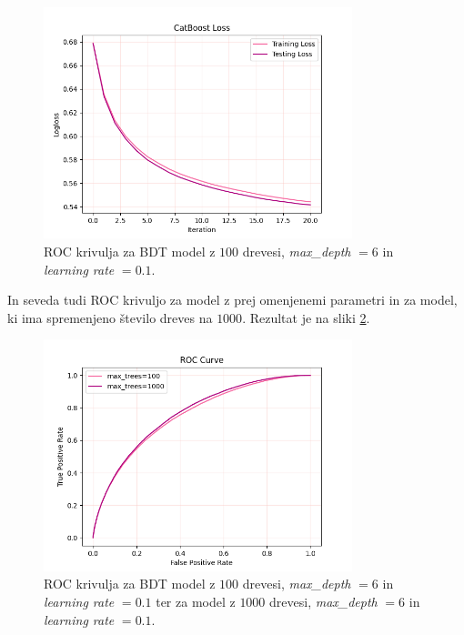 \documentclass[a4paper]{article}
\begin{document}
\begin{figure}[H]
    \centering
    \includegraphics[width=0.8\textwidth]{../images/catboost_loss.png}
    \caption{ROC krivulja za BDT model z $100$ drevesi, \textit{max\_depth} $= 6$ in \textit{learning rate} $= 0.1$.}
    \label{fig:BDT_ROC}
\end{figure}

In seveda tudi ROC krivuljo za model z prej omenjenemi parametri in za model, ki ima spremenjeno število dreves na $1000$. 
Rezultat je na sliki \ref{fig:BDT_ROC}. \\

\begin{figure}[H]
    \centering
    \includegraphics[width=0.8\textwidth]{../images/catboost_roc.png}
    \caption{ROC krivulja za BDT model z $100$ drevesi, \textit{max\_depth} $= 6$ in \textit{learning rate} $= 0.1$ ter za 
    model z $1000$ drevesi, \textit{max\_depth} $= 6$ in \textit{learning rate} $= 0.1$.}
    \label{fig:BDT_ROC}
\end{figure}
\end{document}
